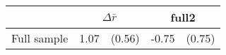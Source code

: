 {
\def\sym#1{\ifmmode^{#1}\else\(^{#1}\)\fi}
\begin{tabular*}{.65\hsize}{@{\hskip\tabcolsep\extracolsep\fill}l*{2}{lc}}
\toprule
                &\multicolumn{2}{c}{$\Delta \bar{r}$}&\multicolumn{2}{c}{full2}   \\
\midrule
Full sample     &     1.07         &   (0.56)&    -0.75         &   (0.75)\\
\bottomrule
\end{tabular*}
}

